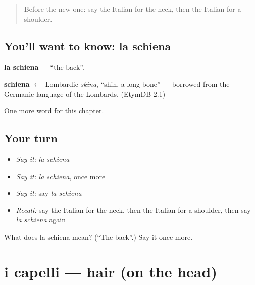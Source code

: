 \label{lesson:IT-C38-schiena}



\begin{quote}
Before the new one: say the Italian for the neck, then the Italian for a shoulder.
\end{quote}

\subsection*{You'll want to know: la schiena}
\textbf{la schiena} — \textquotedblleft{}the back\textquotedblright{}.

\begin{cousinweb}
\textbf{schiena} $\leftarrow$ Lombardic \emph{skina}, \textquotedblleft{}shin, a long bone\textquotedblright{} — borrowed from the Germanic language of the Lombards. (EtymDB 2.1)
\end{cousinweb}

\begin{grammarlens}[title={What you've built}]
One more word for this chapter.
\end{grammarlens}

\subsection*{Your turn}
\begin{itemize}
\raggedright
  \item \emph{Say it:} \emph{la schiena}
  \item \emph{Say it:} \emph{la schiena}, once more
  \item \emph{Say it:} say \emph{la schiena}
  \item \emph{Recall:} say the Italian for the neck, then the Italian for a shoulder, then say \emph{la schiena} again
\end{itemize}

\begin{tcolorbox}[breakable,colback=teal!4,colframe=teal!35!black,title={Before you move on}]
What does la schiena mean? (\textquotedblleft{}The back\textquotedblright{}.) Say it once more.
\end{tcolorbox}
\section[i capelli]{i capelli — hair (on the head)}

\label{lesson:IT-C38-capelli}



